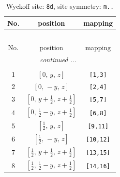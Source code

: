 \documentclass[fleqn,8pt]{jsarticle}
\begin{document}
\begin{longtable}{ccc}
\caption{Wyckoff site: {\tt 8d}, site symmetry: {\tt m..}}
 \\
 \hline \hline
No. & position & mapping \\ \hline \endfirsthead

\multicolumn{2}{l}{\tablename\ \thetable{}} \\
 \hline \hline
No. & position & mapping \\ \hline \endhead

 \hline \hline
\multicolumn{2}{r}{\footnotesize\it continued ...} \\ \endfoot

 \hline \hline
\multicolumn{2}{r}{} \\ \endlastfoot

1 & $\left[ 0,\, y,\, z \right]$ & {\tt [1,3]} \\ \hline
2 & $\left[ 0,\, - y,\, z \right]$ & {\tt [2,4]} \\ \hline
3 & $\left[ 0,\, y + \frac{1}{2},\, z + \frac{1}{2} \right]$ & {\tt [5,7]} \\ \hline
4 & $\left[ 0,\, \frac{1}{2} - y,\, z + \frac{1}{2} \right]$ & {\tt [6,8]} \\ \hline
5 & $\left[ \frac{1}{2},\, y,\, z \right]$ & {\tt [9,11]} \\ \hline
6 & $\left[ \frac{1}{2},\, - y,\, z \right]$ & {\tt [10,12]} \\ \hline
7 & $\left[ \frac{1}{2},\, y + \frac{1}{2},\, z + \frac{1}{2} \right]$ & {\tt [13,15]} \\ \hline
8 & $\left[ \frac{1}{2},\, \frac{1}{2} - y,\, z + \frac{1}{2} \right]$ & {\tt [14,16]} \\
\end{longtable}
\renewcommand{\arraystretch}{1.2}
\end{document}
